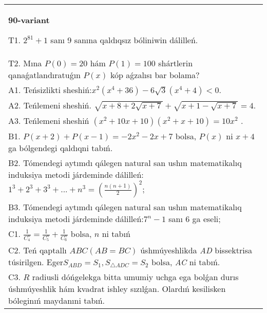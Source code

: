 \documentclass{article}
\begin{document}
\begin{tabular}{m{17cm}}
\textbf{90-variant}
\newline

T1. \(2^{81} + 1\) sanı 9 sanına qaldıqsız bóliniwin dálilleń. \\
T2. Mına \(P(0) = 20\) hám \(P(1) = 100\) shártlerin qanaǵatlandıratuǵın \(P(x)\) kóp aǵzalısı bar bolama? \\
A1. Teńsizlikti sheshiń:\(x^{2}\left( x^{4} + 36 \right) - 6\sqrt{3}\left( x^{4} + 4 \right) < 0\). \\
A2. Teńlemeni sheshiń. \(\sqrt{x + 8 + 2\sqrt{x + 7}} + \sqrt{x + 1 - \sqrt{x + 7}} = 4\). \\
A3. Teńlemeni sheshiń \(\left( x^{2} + 10x + 10 \right)\left( x^{2} + x + 10 \right) = 10x^{2}\) . \\
B1. \(P(x + 2) + P(x - 1) = - 2x^{2} - 2x + 7\) bolsa, \(P(x)\) ni \(x + 4\) ga bólgendegi qaldıqni tabıń. \\
B2. Tómendegi aytımdı qálegen natural san ushın matematikalıq induksiya metodi járdeminde dálilleń: \(1^{3} + 2^{3} + 3^{3} + ... + n^{3} = \left( \frac{n(n + 1)}{2} \right)^{2}\); \\
B3. Tómendegi aytımdı qálegen natural san ushın matematikalıq induksiya metodi járdeminde dálilleń:\(7^{n} - 1\) sanı 6 ga eseli; \\
C1. \(\frac{1}{C_{4}^{n}} = \frac{1}{C_{5}^{n}} + \frac{1}{C_{6}^{n}}\) bolsa, \(n\) ni tabıń \\
C2. Teń qaptallı \(ABC(AB = BC)\) úshmúyeshlikda \emph{AD} bissektrisa túsirilgen. Eger\(S_{ABD} = S_{1},S_{\bigtriangleup ADC} = S_{2}\) bolsa, \emph{AC} ni tabıń. \\
C3. \(R\) radiusli dóńgelekga bitta umumiy uchga ega bolǵan durıs úshmúyeshlik hám kvadrat ishley sızılǵan. Olardıń kesilisken bóleginıń maydanıni tabıń. \\

\end{tabular}
\vspace{1cm}
\end{document}

